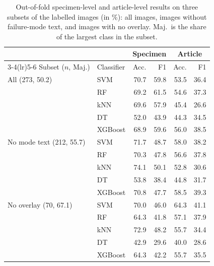\begin{table}[t]
\centering
\caption{Out-of-fold specimen-level and article-level results on three subsets of the labelled images (in \%): all images, images without failure-mode text, and images with no overlay. Maj.\ is the share of the largest class in the subset.}
\label{tab:overlay}
\begin{tabular}{l l r r r r}
\toprule
 & & \multicolumn{2}{c}{Specimen} & \multicolumn{2}{c}{Article} \\
\cmidrule(lr){3-4}\cmidrule(lr){5-6}
Subset ($n$, Maj.) & Classifier & Acc. & F1 & Acc. & F1 \\
\midrule
All (273, 50.2) & SVM & 70.7 & 59.8 & 53.5 & 36.4 \\
 & RF & 69.2 & 61.5 & 54.6 & 37.3 \\
 & kNN & 69.6 & 57.9 & 45.4 & 26.6 \\
 & DT & 52.0 & 43.9 & 44.3 & 34.5 \\
 & XGBoost & 68.9 & 59.6 & 56.0 & 38.5 \\
\midrule
No mode text (212, 55.7) & SVM & 71.7 & 48.7 & 58.0 & 38.2 \\
 & RF & 70.3 & 47.8 & 56.6 & 37.8 \\
 & kNN & 74.1 & 50.1 & 52.8 & 30.6 \\
 & DT & 53.8 & 38.4 & 44.8 & 31.7 \\
 & XGBoost & 70.8 & 47.7 & 58.5 & 39.3 \\
\midrule
No overlay (70, 67.1) & SVM & 70.0 & 46.0 & 64.3 & 41.1 \\
 & RF & 64.3 & 41.8 & 57.1 & 37.9 \\
 & kNN & 72.9 & 48.2 & 55.7 & 34.4 \\
 & DT & 42.9 & 29.6 & 40.0 & 28.6 \\
 & XGBoost & 64.3 & 42.2 & 55.7 & 35.5 \\
\bottomrule
\end{tabular}
\end{table}

